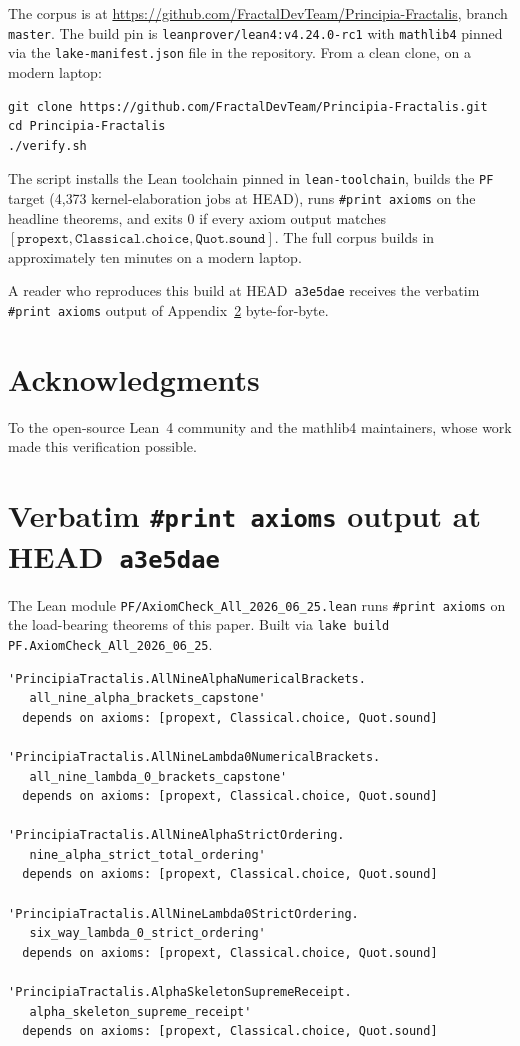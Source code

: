 \documentclass[11pt,a4paper]{amsart}
\theoremstyle{plain}
\theoremstyle{definition}
\begin{document}
The corpus is at \url{https://github.com/FractalDevTeam/Principia-Fractalis}, branch \texttt{master}. The build pin is \texttt{leanprover/lean4:v4.24.0-rc1} with \texttt{mathlib4} pinned via the \texttt{lake-manifest.json} file in the repository. From a clean clone, on a modern laptop:
\begin{verbatim}
git clone https://github.com/FractalDevTeam/Principia-Fractalis.git
cd Principia-Fractalis
./verify.sh
\end{verbatim}
The script installs the Lean toolchain pinned in \texttt{lean-toolchain}, builds the \texttt{PF} target (4{,}373 kernel-elaboration jobs at HEAD), runs \texttt{\#print axioms} on the headline theorems, and exits $0$ if every axiom output matches $[\texttt{propext}, \texttt{Classical.choice}, \texttt{Quot.sound}]$. The full corpus builds in approximately ten minutes on a modern laptop.

A reader who reproduces this build at HEAD~\texttt{a3e5dae} receives the verbatim \texttt{\#print axioms} output of Appendix~\ref{app:axioms} byte-for-byte.

\section{Acknowledgments}

To the open-source Lean~4 community and the mathlib4 maintainers, whose work made this verification possible.

\appendix

\section{Verbatim \texttt{\#print axioms} output at HEAD~\texttt{a3e5dae}}\label{app:axioms}

The Lean module \texttt{PF/AxiomCheck\_All\_2026\_06\_25.lean} runs \texttt{\#print axioms} on the load-bearing theorems of this paper. Built via \texttt{lake build PF.AxiomCheck\_All\_2026\_06\_25}.

\begin{small}
\begin{verbatim}
'PrincipiaTractalis.AllNineAlphaNumericalBrackets.
   all_nine_alpha_brackets_capstone'
  depends on axioms: [propext, Classical.choice, Quot.sound]

'PrincipiaTractalis.AllNineLambda0NumericalBrackets.
   all_nine_lambda_0_brackets_capstone'
  depends on axioms: [propext, Classical.choice, Quot.sound]

'PrincipiaTractalis.AllNineAlphaStrictOrdering.
   nine_alpha_strict_total_ordering'
  depends on axioms: [propext, Classical.choice, Quot.sound]

'PrincipiaTractalis.AllNineLambda0StrictOrdering.
   six_way_lambda_0_strict_ordering'
  depends on axioms: [propext, Classical.choice, Quot.sound]

'PrincipiaTractalis.AlphaSkeletonSupremeReceipt.
   alpha_skeleton_supreme_receipt'
  depends on axioms: [propext, Classical.choice, Quot.sound]
\end{verbatim}
\end{small}
\end{document}
